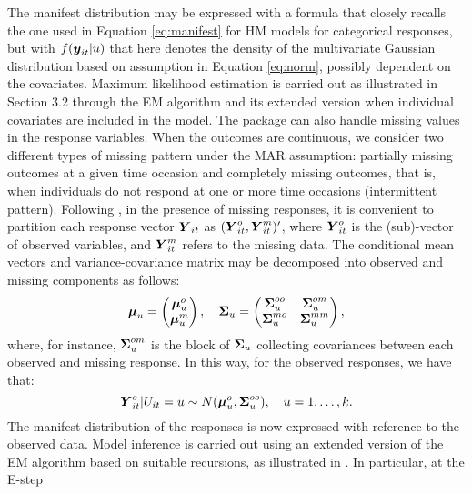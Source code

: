 The manifest distribution may be expressed with a formula that closely
recalls the one used in Equation \eqref{eq:manifest} for HM models for
categorical responses, but with \(f(\mbox{\boldmath $y$}_{it}|u)\) that here denotes the
density of the multivariate Gaussian distribution based on assumption in
Equation \eqref{eq:norm}, possibly dependent on the covariates. Maximum
likelihood estimation is carried out as illustrated in Section 3.2
through the EM algorithm and its extended version when individual
covariates are included in the model. The  package can
also handle missing values in the response variables. When the outcomes
are continuous, we consider two different types of missing pattern under
the MAR assumption: partially missing outcomes at a given time occasion
and completely missing outcomes, that is, when individuals do not
respond at one or more time occasions (intermittent pattern). Following
\cite{pand:bart:penn:23}, in the presence of missing responses, it is
convenient to partition each response vector \(\mbox{\boldmath $Y$}_{it}\) as
\((\mbox{\boldmath $Y$}_{it}^o, \mbox{\boldmath $Y$}_{it}^m)^\prime\), where \(\mbox{\boldmath $Y$}_{it}^o\) is the
(sub)-vector of observed variables, and \(\mbox{\boldmath $Y$}_{it}^m\) refers to the
missing data. The conditional mean vectors and variance-covariance
matrix may be decomposed into observed and missing components as
follows:
\[
\mbox{\boldmath $\mu$}_u =  \begin{pmatrix}
\mbox{\boldmath $\mu$}_u^{o} \\
\mbox{\boldmath $\mu$}_{u}^m
\end{pmatrix}, \quad \mbox{\boldmath $\Sigma$}_u =  \begin{pmatrix}
\mbox{\boldmath $\Sigma$}_u^{oo} &  \mbox{\boldmath $\Sigma$}_u^{om}\\
\mbox{\boldmath $\Sigma$}_u^{mo} & \mbox{\boldmath $\Sigma$}_u^{mm}
\end{pmatrix},
\]
where, for instance, \(\mbox{\boldmath $\Sigma$}_u^{om}\) is the block of
\(\mbox{\boldmath $\Sigma$}_u\) collecting covariances between each observed and missing
response. In this way, for the observed responses, we have that:
\[
\mbox{\boldmath $Y$}_{it}^o|U_{it}=u\sim N( \mbox{\boldmath $\mu$}_u^o, \mbox{\boldmath $\Sigma$}_u^{oo}),\quad u=1,\ldots,k.
\label{eq:normMiss}
\]
The manifest distribution of the responses is now expressed with
reference to the observed data. Model inference is carried out using an
extended version of the EM algorithm based on suitable recursions, as
illustrated in \cite{pand:bart:penn:23}. In particular, at the E-step
